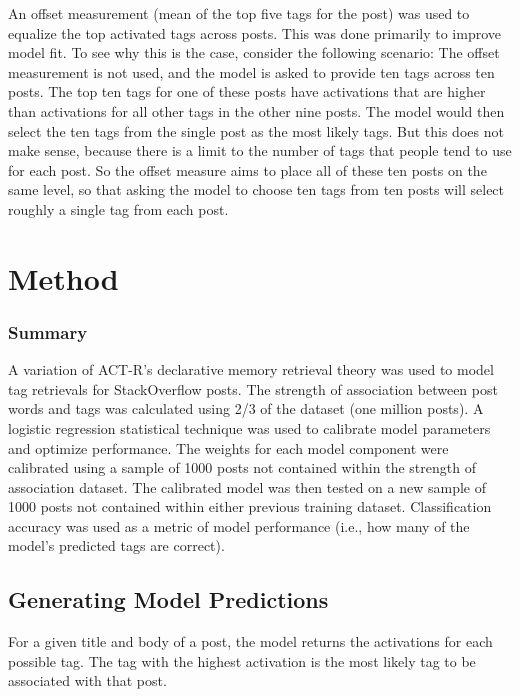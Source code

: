 \documentclass[10pt,letterpaper]{article}
\begin{document}
An offset measurement (mean of the top five tags for the post) was used to equalize the top activated tags across posts.
This was done primarily to improve model fit.
To see why this is the case, consider the following scenario:
The offset measurement is not used, and the model is asked to provide ten tags across ten posts.
The top ten tags for one of these posts have activations that are higher than activations for all other tags in the other nine posts.
The model would then select the ten tags from the single post as the most likely tags.
But this does not make sense, because there is a limit to the number of tags that people tend to use for each post.
So the offset measure aims to place all of these ten posts on the same level, so that asking the model to choose ten tags from ten posts will select roughly a single tag from each post.

\section{Method}

\subsubsection{Summary}

A variation of ACT-R's declarative memory retrieval theory \cite{Anderson2004} was used to model tag retrievals for StackOverflow posts.
The strength of association between post words and tags was calculated using 2/3 of the dataset (one million posts).
A logistic regression statistical technique was used to calibrate model parameters and optimize performance.
The weights for each model component were calibrated using a sample of \num{1000} posts not contained within the strength of association dataset.
The calibrated model was then tested on a new sample of \num{1000} posts not contained within either previous training dataset.
Classification accuracy was used as a metric of model performance (i.e., how many of the model's predicted tags are correct).

\subsection{Generating Model Predictions}

For a given title and body of a post, the model returns the activations for each possible tag.
The tag with the highest activation is the most likely tag to be associated with that post.
\end{document}
